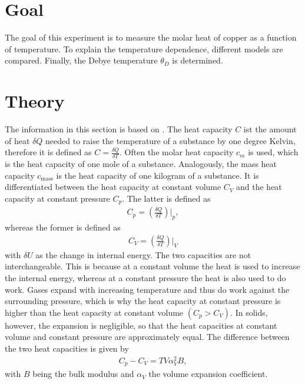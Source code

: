\section{Goal}
\label{sec:goal}
The goal of this experiment is to measure the molar heat of copper as a function of temperature.
To explain the temperature dependence, different models are compared.
Finally, the Debye temperature $\theta_D$ is determined.

\section{Theory}
\label{sec:theory}

The information in this section is based on \cite{GrossMarx+2014}. \newline
The heat capacity $C$ ist the amount of heat $\delta Q$ needed to raise the temperature of a substance by one degree Kelvin, therefore it is defined as $C = \frac{\delta Q}{\delta T}$.
Often the molar heat capacity $c_m$ is used, which is the heat capacity of one mole of a substance.
Analogously, the mass heat capacity $c_{\text{mass}}$ is the heat capacity of one kilogram of a substance.
It is differentiated between the heat capacity at constant volume $C_V$ and the heat capacity at constant pressure $C_p$.
The latter is defined as 
\begin{align}
    C_p = \left(\frac{\delta Q}{\delta T}\right)\Big|_p,
    \label{eq:cp}
\end{align}
whereas the former is defined as
\begin{align}
    C_V = \left(\frac{\delta Q}{\delta T}\right)\Big|_V
    \label{eq:cv}
\end{align}
with $\delta U$ as the change in internal energy.
The two capacities are not interchangeable.
This is because at a constant volume the heat is used to increase the internal energy, whereas at a constant pressure the heat is also used to do work.
Gases expand with increasing temperature and thus do work against the surrounding pressure, which is why the heat capacity at constant pressure is higher than the heat capacity at constant volume $(C_p>C_V)$.
In solids, however, the expansion is negligible, so that the heat capacities at constant volume and constant pressure are approximately equal.
The difference between the two heat capacities is given by
\begin{align}
    C_p-C_V=TV\alpha^2_V B,
    \label{eq:cp-cv}
\end{align}
with $B$ being the bulk modulus and $\alpha_V$ the volume expansion coefficient.

